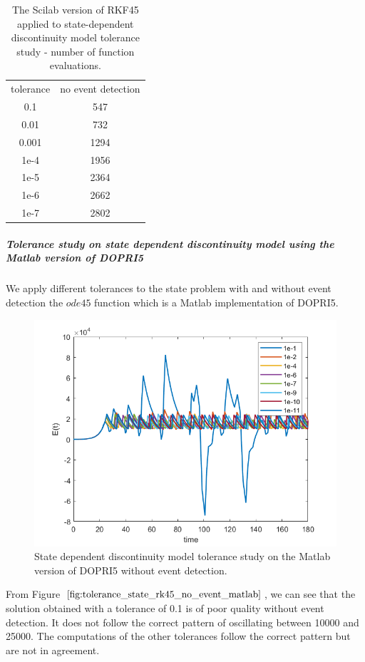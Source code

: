 \begin{table}[h]
\caption {The Scilab version of RKF45 applied to state-dependent discontinuity model tolerance study - number of function evaluations.} \label{tab:tolerance_state_discontinuity_rk45_scilab} 
\begin{center}
\begin{tabular}{ c c }
tolerance & no event detection \\ 
0.1 & 547 \\
0.01 & 732 \\
0.001 & 1294 \\
1e-4 & 1956 \\
1e-5 & 2364 \\
1e-6 & 2662 \\
1e-7 & 2802 \\
\end{tabular}
\end{center}
\end{table}

\subparagraph{Tolerance study on state dependent discontinuity model using the Matlab version of DOPRI5}
We apply different tolerances to the state problem with and without event detection the $ode45$ function which is a Matlab implementation of DOPRI5.

\begin{figure}[h]
\centering
\includegraphics[width=0.7\linewidth]{./figures/tolerance_state_rk45_no_event_matlab}
\caption{State dependent discontinuity model tolerance study on the Matlab version of DOPRI5 without event detection.}
\label{fig:tolerance_state_rk45_no_event_matlab}
\end{figure}

From Figure $\ref{fig:tolerance_state_rk45_no_event_matlab}$, we can see that the solution obtained with a tolerance of 0.1 is of poor quality without event detection. It does not follow the correct pattern of oscillating between 10000 and 25000. The computations of the other tolerances follow the correct pattern but are not in agreement.

